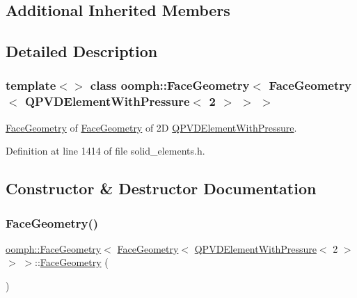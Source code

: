 \subsection*{Additional Inherited Members}


\subsection{Detailed Description}
\subsubsection*{template$<$$>$\newline
class oomph\+::\+Face\+Geometry$<$ Face\+Geometry$<$ Q\+P\+V\+D\+Element\+With\+Pressure$<$ 2 $>$ $>$ $>$}

\hyperlink{classoomph_1_1FaceGeometry}{Face\+Geometry} of \hyperlink{classoomph_1_1FaceGeometry}{Face\+Geometry} of 2D \hyperlink{classoomph_1_1QPVDElementWithPressure}{Q\+P\+V\+D\+Element\+With\+Pressure}. 

Definition at line 1414 of file solid\+\_\+elements.\+h.



\subsection{Constructor \& Destructor Documentation}
\mbox{\label{classoomph_1_1FaceGeometry_3_01FaceGeometry_3_01QPVDElementWithPressure_3_012_01_4_01_4_01_4_a341fed8604bba1192d7448518741cf1d}} 
\subsubsection{\texorpdfstring{Face\+Geometry()}{FaceGeometry()}}
{\footnotesize\ttfamily \hyperlink{classoomph_1_1FaceGeometry}{oomph\+::\+Face\+Geometry}$<$ \hyperlink{classoomph_1_1FaceGeometry}{Face\+Geometry}$<$ \hyperlink{classoomph_1_1QPVDElementWithPressure}{Q\+P\+V\+D\+Element\+With\+Pressure}$<$ 2 $>$ $>$ $>$\+::\hyperlink{classoomph_1_1FaceGeometry}{Face\+Geometry} (\begin{DoxyParamCaption}{ }\end{DoxyParamCaption})\hspace{0.3cm}{\ttfamily [inline]}}



